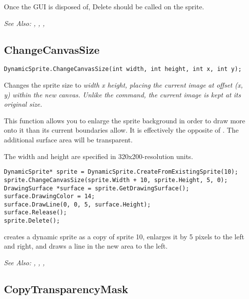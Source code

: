 Once the GUI is disposed of, Delete should be called on the sprite.

\it{See Also:} ,
,
,


\subsection{ChangeCanvasSize}\label{DynamicSprite.ChangeCanvasSize}%

\begin{verbatim}
DynamicSprite.ChangeCanvasSize(int width, int height, int x, int y);
\end{verbatim}
Changes the sprite size to \it{width} x \it{height}, placing the current image
at offset (x, y) within the new canvas. Unlike the 
command, the current image is kept at its original size.

This function allows you to enlarge the sprite background in order to draw
more onto it than its current boundaries allow. It is effectively the
opposite of . The additional surface area
will be transparent.

The width and height are specified in 320x200-resolution units.

\begin{verbatim}
DynamicSprite* sprite = DynamicSprite.CreateFromExistingSprite(10);
sprite.ChangeCanvasSize(sprite.Width + 10, sprite.Height, 5, 0);
DrawingSurface *surface = sprite.GetDrawingSurface();
surface.DrawingColor = 14;
surface.DrawLine(0, 0, 5, surface.Height);
surface.Release();
sprite.Delete();
\end{verbatim}
creates a dynamic sprite as a copy of sprite 10, enlarges it by 5 pixels to the
left and right, and draws a line in the new area to the left.

\it{See Also:} ,
,
,


\subsection{CopyTransparencyMask}\label{DynamicSprite.CopyTransparencyMask}%

